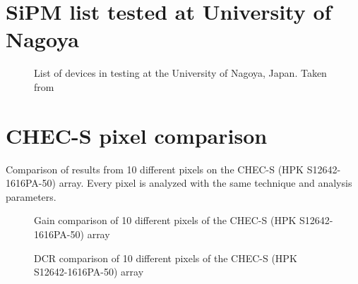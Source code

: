 \documentclass[12pt,article,type=msc,colorback,accentcolor=tud9c]{tudthesis}
\begin{document}
\clearpage
\section{SiPM list tested at University of Nagoya}
\label{appsec:Nagoya_list}
\begin{figure}[h!]
\begin{centering}
\caption[List of devices in testing at the University of Nagoya, Japan.]{List of devices in testing at the University of Nagoya, Japan. Taken from \cite{Hiro_Amsterdam}}
\label{app:Nagoya_list}
\end{centering}
\end{figure}





\clearpage
\section{CHEC-S pixel comparison}
\label{appsec:CHEC_S_multipixel}
Comparison of results from 10 different pixels on the CHEC-S (HPK S12642-1616PA-50) array. Every pixel is analyzed with the same technique and analysis parameters.

\begin{figure}[h]
\begin{centering}
\caption[CHEC-S pixel comparison of the gain]{Gain comparison of 10 different pixels of the CHEC-S (HPK S12642-1616PA-50) array}
\label{app:CHEC_S_multipixel_Gain}
\end{centering}
\end{figure}

\begin{figure}[h]
\begin{centering}
\caption[CHEC-S pixel comparison of the DCR]{DCR comparison of 10 different pixels of the CHEC-S (HPK S12642-1616PA-50) array}
\label{app:CHEC_S_multipixel_DCR}
\end{centering}
\end{figure}
\end{document}
